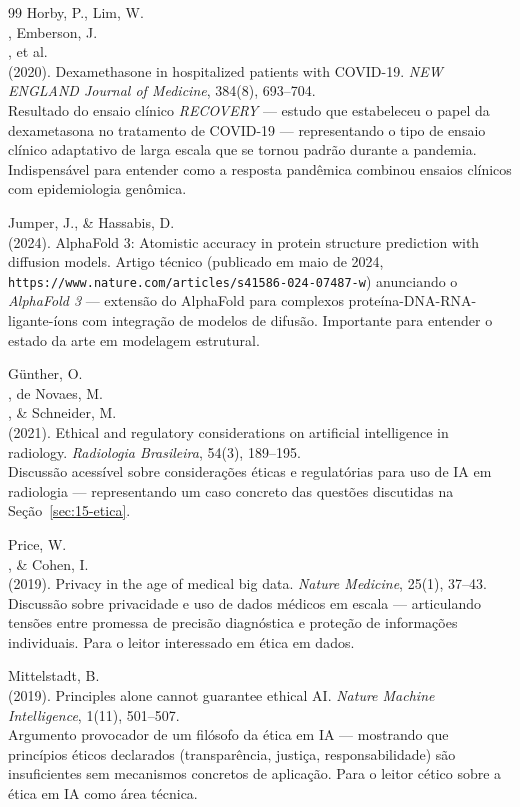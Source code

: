 \begin{thebibliography}{99}
 Horby, P., Lim, W.\\, Emberson, J.\\, et al.\\ (2020). Dexamethasone in hospitalized patients with COVID-19. \emph{NEW ENGLAND Journal of Medicine}, 384(8), 693--704.\\ Resultado do ensaio clínico \emph{RECOVERY} --- estudo que estabeleceu o papel da dexametasona no tratamento de COVID-19 --- representando o tipo de ensaio clínico adaptativo de larga escala que se tornou padrão durante a pandemia. Indispensável para entender como a resposta pandêmica combinou ensaios clínicos com epidemiologia genômica.

 Jumper, J., \& Hassabis, D.\\ (2024). AlphaFold 3: Atomistic accuracy in protein structure prediction with diffusion models. Artigo técnico (publicado em maio de 2024, \texttt{https://www.nature.com/articles/s41586-024-07487-w}) anunciando o \emph{AlphaFold 3} --- extensão do AlphaFold para complexos proteína-DNA-RNA-ligante-íons com integração de modelos de difusão. Importante para entender o estado da arte em modelagem estrutural.

 Günther, O.\\, de Novaes, M.\\, \& Schneider, M.\\ (2021). Ethical and regulatory considerations on artificial intelligence in radiology. \emph{Radiologia Brasileira}, 54(3), 189--195.\\ Discussão acessível sobre considerações éticas e regulatórias para uso de IA em radiologia --- representando um caso concreto das questões discutidas na Seção~\ref{sec:15-etica}.

 Price, W.\\, \& Cohen, I.\\ (2019). Privacy in the age of medical big data. \emph{Nature Medicine}, 25(1), 37--43.\\ Discussão sobre privacidade e uso de dados médicos em escala --- articulando tensões entre promessa de precisão diagnóstica e proteção de informações individuais. Para o leitor interessado em ética em dados.

 Mittelstadt, B.\\ (2019). Principles alone cannot guarantee ethical AI. \emph{Nature Machine Intelligence}, 1(11), 501--507.\\ Argumento provocador de um filósofo da ética em IA --- mostrando que princípios éticos declarados (transparência, justiça, responsabilidade) são insuficientes sem mecanismos concretos de aplicação. Para o leitor cético sobre a ética em IA como área técnica.


\end{thebibliography}
